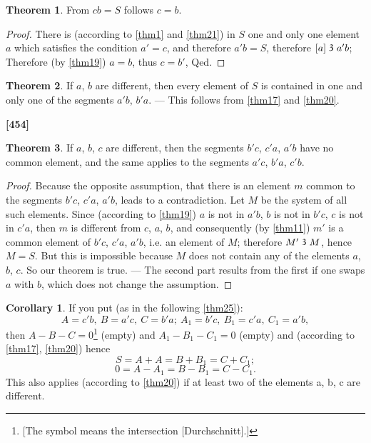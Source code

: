 \documentclass[leqno]{article}
\theoremstyle{definition}
\newtheorem{theorem}{Theorem}
\newtheorem*{corollary}{Corollary}
\newcommand\partof{\mathrel{\raisebox{0.45ex}{$\mathfrak{3}$}}}
\begin{document}
\begin{theorem}\label{thm22}
From $cb=S$ follows $c = b$.
\end{theorem}

\begin{proof}
There is (according to \ref{thm1} and \ref{thm21}) in $S$ one and only one element $a$ which satisfies the condition $a'=c$, and therefore $a'b = S$, therefore $[a] \partof a'b$; Therefore (by \ref{thm19}) $a=b$, thus $c=b'$, Qed.
\end{proof}

\begin{theorem}\label{thm23}
If $a$, $b$ are different, then every element of $S$ is contained in one and only one of the segments $a'b$, $b'a$. --- This follows from \ref{thm17} and \ref{thm20}.
\end{theorem}

\noindent \textbf{[454]}

\begin{theorem}\label{thm24}
If $a$, $b$, $c$ are different, then the segments $b'c$, $c'a$, $a'b$ have no common element, and the same applies to the segments $a'c$, $b'a$, $c'b$.
\end{theorem}
\begin{proof}
Because the opposite assumption, that there is an element $m$ common to the segments $b'c$, $c'a$, $a'b$, leads to a contradiction. 
Let $M$ be the system of all such elements. 
Since (according to \ref{thm19}) $a$ is not in $a'b$, $b$ is not in $b'c$, $c$ is not in $c'a$, then $m$ is different from $c$, $a$, $b$, and consequently (by \ref{thm11}) $m'$ is a common element of $b'c$, $c'a$, $a'b$, i.e. an element of $M$; therefore $M' \partof M$, hence  $M=S$. 
But this is impossible because $M$ does not contain any of the elements $a$, $b$, $c$. So our theorem is true. 
--- The second part results from the first if one swaps $a$ with $b$, which does not change the assumption.\end{proof}

\begin{corollary}
If you put (as in the following \ref{thm25}):
\[
    A=c'b,\ B=a'c,\ C = b'a;\ A_1 = b'c,\ B_1 = c'a,\ C_1 = a'b, 
\]
then $A-B-C=0$\footnote{[The symbol means the intersection [Durchschnitt].]} (empty) and $A_1- B_1 - C_1=0$ (empty) and (according to \ref{thm17}, \ref{thm20}) hence
\[
S = A + A = B + B_1 = C +C_1;
\]
\[
0=A-A_1=B-B_1=C-C_1.
\]
This also applies (according to \ref{thm20}) if at least two of the elements a, b, c are different.\end{corollary}
\end{document}
